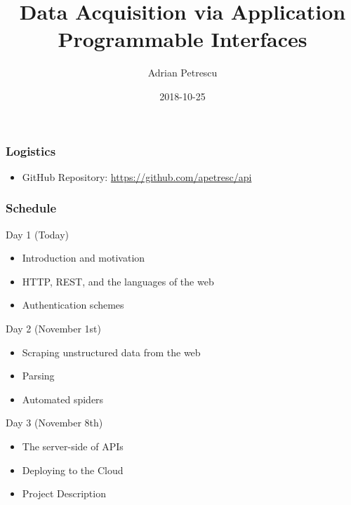\documentclass{beamer}
\title[(APIs for short)]{Data Acquisition via Application Programmable Interfaces}
\author{Adrian Petrescu}
\institute{Rubikloud}
\date{2018-10-25}
\begin{document}
\frame{\titlepage}


\begin{frame}
  \frametitle{Logistics}
  
  \begin{itemize}
    \item GitHub Repository: \href{https://github.com/apetresc/api}{https://github.com/apetresc/api}
  \end{itemize}
\end{frame}


\begin{frame}
  \frametitle{Schedule}
  
  Day 1 (Today)
  \begin{itemize}
    \item Introduction and motivation
    \item HTTP, REST, and the languages of the web
    \item Authentication schemes
  \end{itemize}

  Day 2 (November 1st)
  \begin{itemize}
    \item Scraping unstructured data from the web
    \item Parsing 
    \item Automated spiders
  \end{itemize}

  Day 3 (November 8th)
  \begin{itemize}
    \item The server-side of APIs
    \item Deploying to the Cloud
    \item Project Description
  \end{itemize}
\end{frame}


\begin{frame}
  \frametitle{}
\end{frame}
\end{document}
